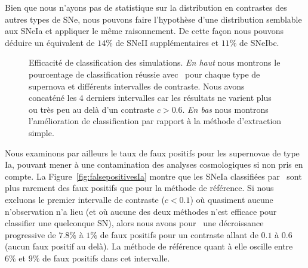 \documentclass[../main/main.tex]{subfiles}
\begin{document}
Bien que nous n'ayons pas de statistique sur la distribution en contrastes des autres
types de SNe, nous pouvons faire l'hypothèse d'une distribution
semblable aux SNeIa et appliquer le même raisonnement. De cette façon
nous pouvons déduire un équivalent de $14\%$ de SNeII supplémentaires
et $11\%$ de SNeIbc.

\begin{figure}[ht]
  \centering
  \caption[Efficacité de classification des simulations.]{Efficacité de
    classification des simulations. \emph{En haut} nous montrons le pourcentage
  de classification réussie avec \hypergal\ pour chaque type de
  supernova et différents intervalles de contraste. Nous avons concaténé les $4$
  derniers intervalles car les résultats ne varient plus ou très
  peu au delà d'un contraste $c>0.6$. \emph{En bas} nous montrons
  l'amélioration de classification par rapport à la méthode d'extraction
simple. }
  \label{fig:typingimprove_snr}
\end{figure}

Nous examinons par ailleurs le taux de faux positifs pour les supernovae
de type Ia, pouvant mener à une contamination des analyses cosmologiques
si non pris en compte. La Figure~\ref{fig:falsepositivesIa} montre que
les SNeIa classifiées par \hypergal\ sont plus
rarement des faux positifs que pour la méthode de référence. Si nous
excluons le premier intervalle de contraste ($c<0.1$) où quasiment
aucune n'observation n'a lieu (et où aucune des deux
méthodes n'est efficace pour classifier une quelconque SN), alors nous
avons pour \hypergal\ une décroissance progressive de $7.8\%$ à $1\%$ de
faux positifs pour un contraste allant de $0.1$ à $0.6$ (aucun faux
positif au delà).
La méthode de référence quant à elle oscille entre $6\%$ et $9\%$ de
faux positifs dans cet intervalle.
\end{document}
